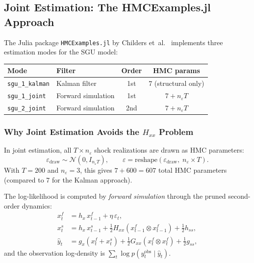 \documentclass[11pt,a4paper]{article}
\theoremstyle{definition}
\begin{document}
	\subsection{Joint Estimation: The HMCExamples.jl Approach}
	\label{sec:joint_estimation}

	The Julia package \texttt{HMCExamples.jl} by Childers et~al.~\cite{childers2024} implements three estimation modes for the SGU model:

	\begin{center}
	\begin{tabular}{llcc}
		\toprule
		\textbf{Mode} & \textbf{Filter} & \textbf{Order} & \textbf{HMC params} \\
		\midrule
		\texttt{sgu\_1\_kalman} & Kalman filter & 1st & 7 (structural only) \\
		\texttt{sgu\_1\_joint} & Forward simulation & 1st & $7 + n_\varepsilon T$ \\
		\texttt{sgu\_2\_joint} & Forward simulation & 2nd & $7 + n_\varepsilon T$ \\
		\bottomrule
	\end{tabular}
	\end{center}

	\subsubsection{Why Joint Estimation Avoids the $H_{xx}$ Problem}

	In joint estimation, all $T \times n_\varepsilon$ shock realizations are drawn as HMC parameters:
	\[
		\varepsilon_{\text{draw}} \sim \mathcal{N}(0, I_{n_\varepsilon T}), \qquad
		\varepsilon = \text{reshape}(\varepsilon_{\text{draw}},\; n_\varepsilon \times T).
	\]
	With $T = 200$ and $n_\varepsilon = 3$, this gives $7 + 600 = 607$ total HMC parameters (compared to 7 for the Kalman approach).

	The log-likelihood is computed by \emph{forward simulation} through the pruned second-order dynamics:
	\begin{align}
		x^f_t &= h_x\, x^f_{t-1} + \eta\, \varepsilon_t, \\
		x^s_t &= h_x\, x^s_{t-1} + \tfrac{1}{2} H_{xx}(x^f_{t-1} \otimes x^f_{t-1}) + \tfrac{1}{2} h_{ss}, \\
		\hat{y}_t &= g_x(x^f_t + x^s_t) + \tfrac{1}{2} G_{xx}(x^f_t \otimes x^f_t) + \tfrac{1}{2} g_{ss},
	\end{align}
	and the observation log-density is $\sum_t \log p(y_t^{\text{obs}} \mid \hat{y}_t)$.
\end{document}
